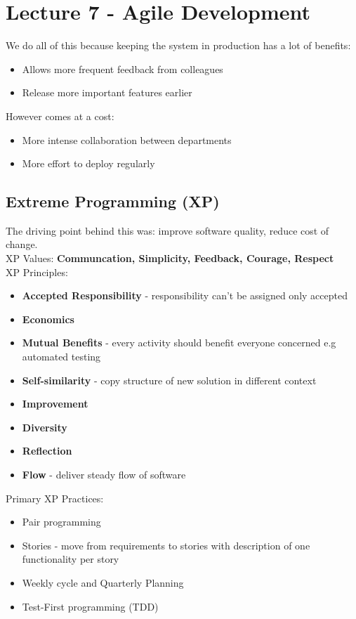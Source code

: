 \documentclass{article}
\begin{document}
\section{Lecture 7 - Agile Development}
We do all of this because keeping the system in production has a lot of benefits:
\begin{itemize}
    \item Allows more frequent feedback from colleagues
    \item Release more important features earlier
\end{itemize}
However comes at a cost:
\begin{itemize}
    \item More intense collaboration between departments
    \item More effort to deploy regularly
\end{itemize}
\subsection{Extreme Programming (XP)}
The driving point behind this was: improve software quality, reduce cost of change. \\
XP Values: \textbf{Communcation, Simplicity, Feedback, Courage, Respect} \\
XP Principles:
\begin{itemize}
    \item \textbf{Accepted Responsibility} - responsibility can't be assigned only accepted
    \item \textbf{Economics}
    \item \textbf{Mutual Benefits} - every activity should benefit everyone concerned e.g automated testing
    \item \textbf{Self-similarity} - copy structure of new solution in different context
    \item \textbf{Improvement}
    \item \textbf{Diversity}
    \item \textbf{Reflection}
    \item \textbf{Flow} - deliver steady flow of software
\end{itemize}
Primary XP Practices:
\begin{itemize}
    \item Pair programming
    \item Stories - move from requirements to stories with description of one functionality per story
    \item Weekly cycle and Quarterly Planning
    \item Test-First programming (TDD)
\end{itemize}
\end{document}
